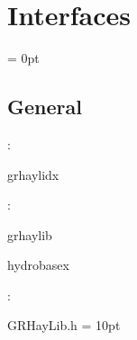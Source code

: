 
\section{Interfaces} 


\parskip = 0pt

\vspace{3mm} \subsection*{General}

: 

grhaylidx
\vspace{2mm}

: 

grhaylib

hydrobasex
\vspace{2mm}

\vspace{5mm}

: 

GRHayLib.h
\vspace{2mm}\parskip = 10pt 

